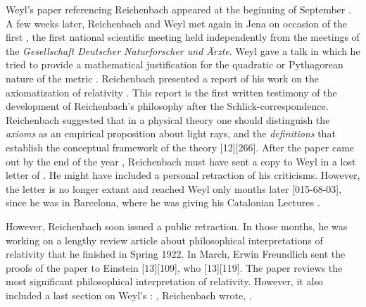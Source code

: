 \documentclass[draft]{article}
\begin{document}
Weyl's paper referencing Reichenbach appeared at the beginning of September \citep{Weyl1921e}. A few weeks later, Reichenbach and Weyl met again in Jena on occasion of the first  , the first national scientific meeting held independently from the meetings of the \textit{Gesellschaft Deutscher Naturforscher und Ärzte}. Weyl gave a talk in which he tried to provide a mathematical justification for the quadratic or Pythagorean nature of the metric \citep{Weyl1921f}. Reichenbach presented a report of his work on the axiomatization of relativity \citep{Reichenbach1921d}. This report is the first written testimony of the development of Reichenbach's philosophy after the Schlick-correspondence. Reichenbach suggested that in a physical theory one should distinguish the \emph{axioms} as an empirical proposition about light rays, \rac\etc and the \emph{definitions} that establish the conceptual framework of the theory [12][266]. After the paper came out by the end of the year \citep{Reichenbach1921d}, Reichenbach must have sent a copy to Weyl in a lost letter of . He might have included a personal retraction of his criticisms. However, the letter is no longer extant and reached Weyl only months later [015-68-03], since he was in Barcelona, where he was giving his Catalonian Lectures \citep{Weyl1923}.

However, Reichenbach soon issued a public retraction. In those months, he was working on a lengthy review article about philosophical interpretations of relativity that he finished in Spring 1922. In March, Erwin Freundlich sent the proofs of the paper  to Einstein [13][109], who  [13][119]. The paper reviews the most significant philosophical interpretation of relativity. However, it also included a last section on Weyl's \uft: , Reichenbach wrote,  \citep[365]{Reichenbach1922a}.
\end{document}
